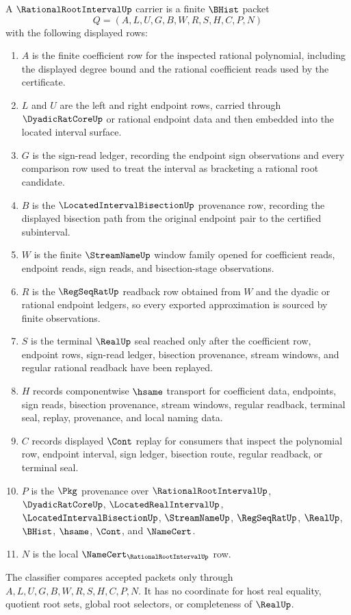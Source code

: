 \begin{definition}
\label{def:rational-root-interval-carrier}
A $\RationalRootIntervalUp$ carrier is a finite $\BHist$ packet
$$
Q=(A,L,U,G,B,W,R,S,H,C,P,N)
$$
with the following displayed rows:
\begin{enumerate}
\item $A$ is the finite coefficient row for the inspected rational polynomial, including the displayed degree bound and the rational coefficient reads used by the certificate.
\item $L$ and $U$ are the left and right endpoint rows, carried through $\DyadicRatCoreUp$ or rational endpoint data and then embedded into the located interval surface.
\item $G$ is the sign-read ledger, recording the endpoint sign observations and every comparison row used to treat the interval as bracketing a rational root candidate.
\item $B$ is the $\LocatedIntervalBisectionUp$ provenance row, recording the displayed bisection path from the original endpoint pair to the certified subinterval.
\item $W$ is the finite $\StreamNameUp$ window family opened for coefficient reads, endpoint reads, sign reads, and bisection-stage observations.
\item $R$ is the $\RegSeqRatUp$ readback row obtained from $W$ and the dyadic or rational endpoint ledgers, so every exported approximation is sourced by finite observations.
\item $S$ is the terminal $\RealUp$ seal reached only after the coefficient row, endpoint rows, sign-read ledger, bisection provenance, stream windows, and regular rational readback have been replayed.
\item $H$ records componentwise $\hsame$ transport for coefficient data, endpoints, sign reads, bisection provenance, stream windows, regular readback, terminal seal, replay, provenance, and local naming data.
\item $C$ records displayed $\Cont$ replay for consumers that inspect the polynomial row, endpoint interval, sign ledger, bisection route, regular readback, or terminal seal.
\item $P$ is the $\Pkg$ provenance over $\RationalRootIntervalUp$, $\DyadicRatCoreUp$, $\LocatedRealIntervalUp$, $\LocatedIntervalBisectionUp$, $\StreamNameUp$, $\RegSeqRatUp$, $\RealUp$, $\BHist$, $\hsame$, $\Cont$, and $\NameCert$.
\item $N$ is the local $\NameCert_{\RationalRootIntervalUp}$ row.
\end{enumerate}
The classifier compares accepted packets only through $A,L,U,G,B,W,R,S,H,C,P,N$. It has no coordinate for host real equality, quotient root sets, global root selectors, or completeness of $\RealUp$.
\end{definition}

